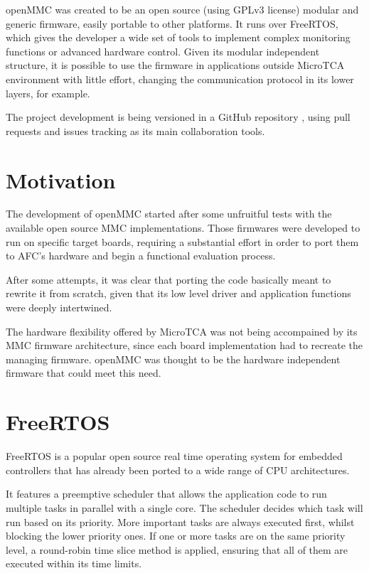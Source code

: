 \documentclass[a4paper,
              ]{jacow}
\begin{document}
openMMC was created to be an open source (using GPLv3 license) modular and generic firmware, easily portable to other platforms. It runs over FreeRTOS, which gives the developer a wide set of tools to implement complex monitoring functions or advanced hardware control.
Given its modular independent structure, it is possible to use the firmware in applications outside MicroTCA environment with little effort, changing the communication protocol in its lower layers, for example.

The project development is being versioned in a GitHub repository \cite{openmmc-github}, using pull requests and issues tracking as its main collaboration tools.

\section{Motivation}
The development of openMMC started after some unfruitful tests with the available open source MMC implementations.
Those firmwares were developed to run on specific target boards, requiring a substantial effort in order to port them to AFC's hardware and begin a functional evaluation process.

After some attempts, it was clear that porting the code basically meant to rewrite it from scratch, given that its low level driver and application functions were deeply intertwined.

The hardware flexibility offered by MicroTCA was not being accompained by its MMC firmware architecture, since each board implementation had to recreate the managing firmware. openMMC was thought to be the hardware independent firmware that could meet this need.

\section{FreeRTOS}
FreeRTOS \cite{freertos} is a popular open source real time operating system for embedded controllers that has already been ported to a wide range of CPU architectures.

It features a preemptive scheduler that allows the application code to run multiple tasks in parallel with a single core.
The scheduler decides which task will run based on its priority. More important tasks are always executed first, whilst blocking the lower priority ones.
If one or more tasks are on the same priority level, a round-robin time slice method is applied, ensuring that all of them are executed within its time limits.
\end{document}
